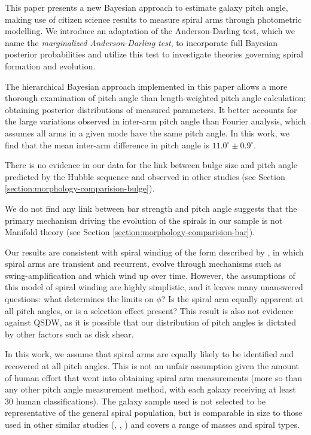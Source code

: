 This paper presents a new Bayesian approach to estimate galaxy pitch angle, making use of citizen science results to measure spiral arms through photometric modelling. We introduce an adaptation of the Anderson-Darling test, which we name the \textit{marginalized Anderson-Darling test}, to incorporate full Bayesian posterior probabilities and utilize this test to investigate theories governing spiral formation and evolution.

The hierarchical Bayesian approach implemented in this paper allows a more thorough examination of pitch angle than length-weighted pitch angle calculation; obtaining posterior distributions of measured parameters. It better accounts for the large variations observed in inter-arm pitch angle than Fourier analysis, which assumes all arms in a given mode have the same pitch angle. In this work, we find that the mean inter-arm difference in pitch angle is $11.0^\circ\pm 0.9^\circ$.

There is no evidence in our data for the link between bulge size and pitch angle predicted by the Hubble sequence and observed in other studies (see Section \ref{section:morphology-comparision-bulge}).

We do not find any link between bar strength and pitch angle suggests that the primary mechanism driving the evolution of the spirals in our sample is not Manifold theory (see Section \ref{section:morphology-comparision-bar}).

Our results are consistent with spiral winding of the form described by \citet{2019arXiv190910291P}, in which spiral arms are transient and recurrent, evolve through mechanisms such as swing-amplification \citep{1965MNRAS.130..125G} and which wind up over time. However, the assumptions of this model of spiral winding are highly simplistic, and it leaves many unanswered questions: what determines the limits on $\phi$? Is the spiral arm equally apparent at all pitch angles, or is a selection effect present? This result is also not evidence against QSDW, as it is possible that our distribution of pitch angles is dictated by other factors such as disk shear.

In this work, we assume that spiral arms are equally likely to be identified and recovered at all pitch angles. This is not an unfair assumption given the amount of human effort that went into obtaining spiral arm measurements (more so than any other pitch angle measurement method, with each galaxy receiving at least 30 human classifications). The galaxy sample used is not selected to be representative of the general spiral population, but is comparable in size to those used in other similar studies (\citealt{2013MNRAS.436.1074S}, \citealt{2019ApJ...871..194Y}, \citealt{2019arXiv190910291P}) and covers a range of masses and spiral types.

